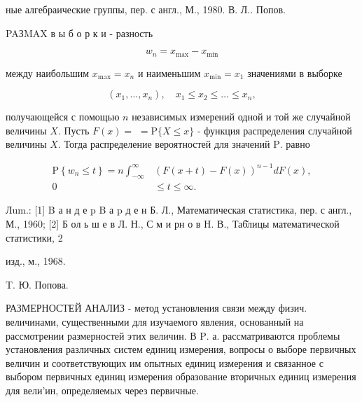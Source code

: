 \documentclass[10pt]{article}
\begin{document}
ные алгебраические группы, пер. с англ., М., 1980. В. Л.. Попов.



PAЗMAX в ы б о р к и - разность



\[

w_{n}=x_{\max }-x_{\min }

\]



между наибольшим $x_{\max }=x_{n}$ и наименьшим $x_{\min }=x_{1}$ значениями в выборке



\[

\left(x_{1}, \ldots, x_{n}\right), \quad x_{1} \leqslant x_{2} \leqslant \ldots \leqslant x_{n},

\]



получающейся с помощью $n$ независимых измерений одной и той же случайной величины $X$. Пусть $F(x)=$ $=\mathrm{P}\{X \leqslant x\}$ - функция распределения случайной величины $X$. Тогда распределение вероятностей для значений $\mathrm{P}$. равно



\[

\begin{aligned}

\mathrm{P}\left\{w_{n} \leqslant t\right\}=n \int_{-\infty}^{\infty} & (F(x+t)-F(x))^{n-1} d F(x), \\

0 & \leqslant t \leqslant \infty .

\end{aligned}

\]



Лum.: [1] B а н д е p B а p д е н Б. Л., Математическая статистика, пер. с англ., М., 1960; [2] Б ол ь ш е в Л. Н., С м и рн о в H. В., Таб̆лицы математической статистики, 2

изд., м., 1968.

T. Ю. Попова.



РАЗМЕРНОСТЕЙ АНАЛИЗ - метод установления связи между физич. величинами, существенными для изучаемого явления, основанный на рассмотрении размерностей этих величин. В $\mathrm{P}$. а. рассматриваются проблемы установления различных систем единиц измерения, вопросы о выборе первичных величин и соответствующих им опытных единиц измерения и связанное с выбором первичных единиц измерения образование вторичных единиц измерения для вели'ин, определяемых через первичные.
\end{document}
